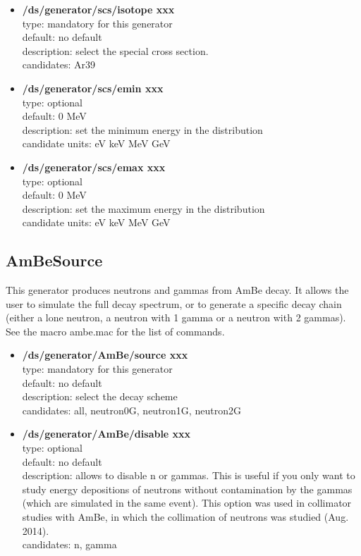 \documentclass[twocolumn, 10pt]{article}
\begin{document}
\begin{itemize}

\item \textbf{/ds/generator/scs/isotope xxx}\\
type: mandatory for this generator \\
default: no default \\
description: select the special cross section.\\
candidates: Ar39

\item \textbf{/ds/generator/scs/emin xxx}\\
type: optional \\
default: 0 MeV\\
description: set the minimum energy in the distribution\\
candidate units: eV keV MeV GeV\\

\item \textbf{/ds/generator/scs/emax xxx}\\
type: optional \\
default: 0 MeV\\
description: set the maximum energy in the distribution\\
candidate units: eV keV MeV GeV\\

\end{itemize}

\subsection{AmBeSource}
This generator produces neutrons and gammas from AmBe decay.  It allows the user to simulate the full decay spectrum, or to generate a specific decay chain (either a lone neutron, a neutron with 1 gamma or a neutron with 2 gammas).
See the macro ambe.mac for the list of commands.

\begin{itemize}

\item \textbf{/ds/generator/AmBe/source xxx}\\
type: mandatory for this generator \\
default: no default \\
description: select the decay scheme \\
candidates: all, neutron0G, neutron1G, neutron2G

\item \textbf{/ds/generator/AmBe/disable xxx}\\
type: optional \\
default: no default \\
description: allows to disable n or gammas. This is useful if you only want to study energy depositions of neutrons without contamination by the gammas (which are simulated in the same event). This option was used in collimator studies with AmBe, in which the collimation of neutrons was studied (Aug. 2014).\\
candidates: n, gamma

\end{itemize}
\end{document}
